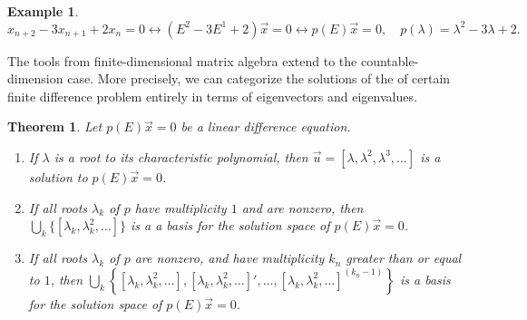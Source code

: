 \documentclass[12pt,reqno]{amsart}
\numberwithin{equation}{section}  %
\newtheorem{theorem}{Theorem}
\newtheorem*{example}{Example}
\begin{document}
\begin{example}
\begin{equation*}
x_{n+2} - 3x_{n+1} + 2x_{n} = 0 \longleftrightarrow (E^2 - 3E^1 + 2)\vec{x} = 0
\longleftrightarrow p(E) \vec{x} = 0, \quad p(\lambda) = \lambda^2 - 3 \lambda
+2.
\end{equation*}
\end{example}
The tools from finite-dimensional matrix algebra extend to the
countable-dimension case. More precisely, we can categorize the solutions of the
of certain finite difference problem entirely in terms of eigenvectors and
eigenvalues.
\begin{theorem}
\label{thm:dif-eq}
Let $p(E) \vec{x} = 0$ be a linear difference equation. 
\begin{enumerate}
  \item 
If $\lambda$ is a root
to its characteristic polynomial, then $\vec{u} = [\lambda, \lambda^2,
\lambda^3, \ldots]$ is a solution to $p(E) \vec{x} = 0$. 
  \item 
If all roots $\lambda_k$ of $p$ have multiplicity $1$ and are nonzero, then
$ \bigcup_k \{ [\lambda_k, \lambda_k^2, \ldots] \}$ is a 
a basis for the solution space of $p(E) \vec{x} = 0$.	
\item If all roots $\lambda_k$ of $p$ are nonzero, and have multiplicity $k_n$
greater than or equal to $1$, then $\bigcup_k \left\{ [\lambda_k, \lambda_k^2,
\ldots], [\lambda_k, \lambda_k^2, \ldots]', \ldots, [\lambda_k, \lambda_k^2,
\ldots ]^{(k_n -1)} \right\}$ is a basis for the solution space of $p(E)
\vec{x} = 0$.
\end{enumerate}
\end{theorem}
\end{document}
